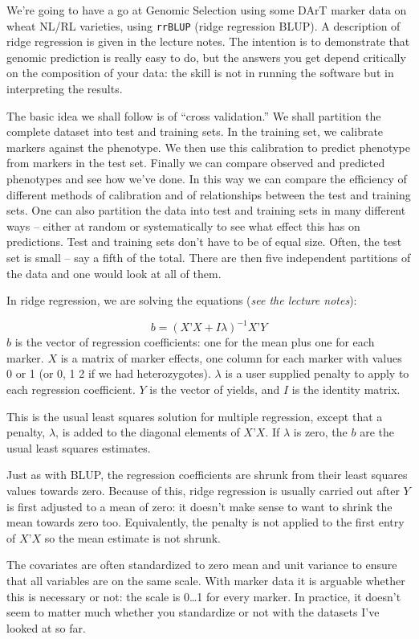 \documentclass[
]{book}
\begin{document}
We're going to have a go at Genomic Selection using some DArT marker data on wheat
NL/RL varieties, using \texttt{rrBLUP} (ridge regression BLUP). A description of ridge regression is
given in the lecture notes. The intention is to demonstrate that genomic prediction is really
easy to do, but the answers you get depend critically on the composition of your data: the
skill is not in running the software but in interpreting the results.

The basic idea we shall follow is of ``cross validation.'' We shall partition the complete
dataset into test and training sets. In the training set, we calibrate markers against the
phenotype. We then use this calibration to predict phenotype from markers in the test set.
Finally we can compare observed and predicted phenotypes and see how we've done. In this way we can compare the efficiency of different methods of calibration and of relationships between the test and training sets. One can also partition the data into test and training sets in many different ways -- either at random or systematically to see what effect this has on predictions. Test and training sets don't have to be of equal size. Often, the test set is small -- say a fifth of the total. There are then five independent partitions of the data and one would look at all of them.

In ridge regression, we are solving the equations (\emph{see the lecture notes}):

\[b = (X’X+Iλ)^{-1} X’Y\]
\(b\) is the vector of regression coefficients: one for the mean plus one for each marker. \(X\) is a matrix of marker effects, one column for each marker with values 0 or 1 (or 0, 1 2 if we had heterozygotes). \(λ\) is a user supplied penalty to apply to each regression coefficient. \(Y\) is the vector of yields, and \(I\) is the identity matrix.

This is the usual least squares solution for multiple regression, except that a penalty, \(λ\), is added to the diagonal elements of \(X’X\). If \(λ\) is zero, the \(b\) are the usual least squares estimates.

Just as with BLUP, the regression coefficients are shrunk from their least squares values
towards zero. Because of this, ridge regression is usually carried out after \(Y\) is first adjusted to a mean of zero: it doesn't make sense to want to shrink the mean towards zero too. Equivalently, the penalty is not applied to the first entry of \(X’X\) so the mean estimate is not shrunk.

The covariates are often standardized to zero mean and unit variance to ensure that all
variables are on the same scale. With marker data it is arguable whether this is necessary or
not: the scale is 0\ldots1 for every marker. In practice, it doesn't seem to matter much whether you standardize or not with the datasets I've looked at so far.
\end{document}
